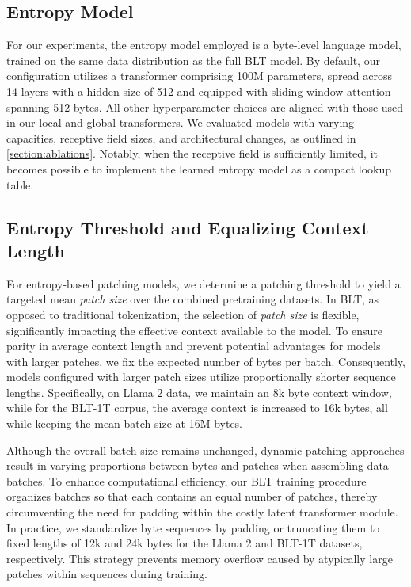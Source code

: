 \subsection{Entropy Model} For our experiments, the entropy model employed is a byte-level language model, trained on the same data distribution as the full {\textsc BLT} model. By default, our configuration utilizes a transformer comprising 100M parameters, spread across 14 layers with a hidden size of 512 and equipped with sliding window attention spanning 512 bytes. All other hyperparameter choices are aligned with those used in our local and global transformers. We evaluated models with varying capacities, receptive field sizes, and architectural changes, as outlined in \autoref{section:ablations}. Notably, when the receptive field is sufficiently limited, it becomes possible to implement the learned entropy model as a compact lookup table.

\subsection{Entropy Threshold and Equalizing Context Length} For entropy-based patching models, we determine a patching threshold to yield a targeted mean \textit{patch size} over the combined pretraining datasets. In {\textsc BLT}, as opposed to traditional tokenization, the selection of \textit{patch size} is flexible, significantly impacting the effective context available to the model. To ensure parity in average context length and prevent potential advantages for models with larger patches, we fix the expected number of bytes per batch. Consequently, models configured with larger patch sizes utilize proportionally shorter sequence lengths. Specifically, on Llama 2 data, we maintain an 8k byte context window, while for the {\textsc BLT}-1T corpus, the average context is increased to 16k bytes, all while keeping the mean batch size at 16M bytes.

Although the overall batch size remains unchanged, dynamic patching approaches result in varying proportions between bytes and patches when assembling data batches. To enhance computational efficiency, our {\textsc BLT} training procedure organizes batches so that each contains an equal number of patches, thereby circumventing the need for padding within the costly latent transformer module. In practice, we standardize byte sequences by padding or truncating them to fixed lengths of 12k and 24k bytes for the Llama 2 and {\textsc BLT}-1T datasets, respectively. This strategy prevents memory overflow caused by atypically large patches within sequences during training.

